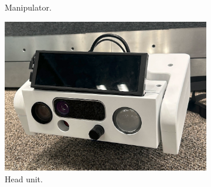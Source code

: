 \documentclass[runningheads,a4paper]{llncs}
\begin{document}
\begin{figure}[tbp]
\begin{minipage}[b]{0.25\linewidth}
\begin{subfigure}[b]{\linewidth}
			\caption{Manipulator.}
			\label{fig:component_arm}
		\end{subfigure}
	\end{minipage}
	\hspace{0.01\linewidth}
	\begin{minipage}[b]{0.25\linewidth}
		\centering
		\begin{subfigure}[b]{\linewidth}
			\includegraphics[width=\linewidth]{images/component_head.png}
			\caption{Head unit.}
			\label{fig:component_head}
		\end{subfigure}
		\begin{subfigure}[b]{\linewidth}

\end{subfigure}
\end{minipage}
\end{figure}
\end{document}
